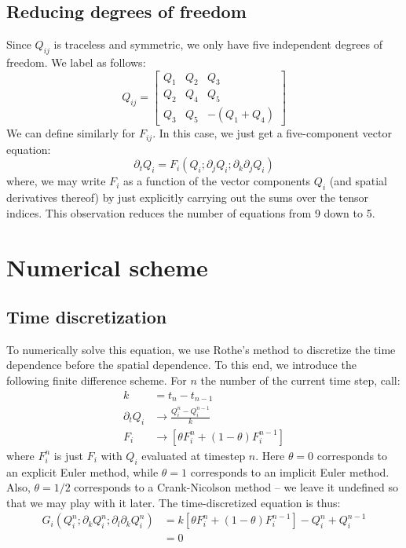 \documentclass[reqno]{article}
\begin{document}
	\subsection{Reducing degrees of freedom}
	Since $Q_{ij}$ is traceless and symmetric, we only have five independent degrees of freedom.
	We label as follows:
	\begin{equation}
	Q_{ij}
	= \begin{bmatrix}
	Q_1 & Q_2 & Q_3 \\
	Q_2 & Q_4 & Q_5 \\
	Q_3 & Q_5 & -(Q_1 + Q_4)
	\end{bmatrix}
	\end{equation}
	We can define similarly for $F_{ij}$.
	In this case, we just get a five-component vector equation:
	\begin{equation}
		\partial_t Q_i = F_i \left( Q_i ; \partial_j Q_i ; \partial_k \partial_j Q_i \right)
	\end{equation}
	where, we may write $F_i$ as a function of the vector components $Q_i$ (and spatial derivatives thereof) by just explicitly carrying out the sums over the tensor indices.
	This observation reduces the number of equations from 9 down to 5.
	
	\section{Numerical scheme}
	\subsection{Time discretization}
	To numerically solve this equation, we use Rothe's method to discretize the time dependence before the spatial dependence.
	To this end, we introduce the following finite difference scheme.
	For $n$ the number of the current time step, call:
	\begin{align}
		k &= t_n - t_{n - 1} \\
		\partial_t Q_i &\to \frac{Q^n_i - Q^{n - 1}_i}{k} \\
		F_i &\to \left[ \theta F_i^n + (1 - \theta) F_i^{n - 1} \right]
	\end{align}
	where $F^n_i$ is just $F_i$ with $Q_i$ evaluated at timestep $n$.
	Here $\theta = 0$ corresponds to an explicit Euler method, while $\theta = 1$ corresponds to an implicit Euler method.
	Also, $\theta = 1/2$ corresponds to a Crank-Nicolson method -- we leave it undefined so that we may play with it later.
	The time-discretized equation is thus:
	\begin{equation}
	\begin{split}
		G_i \left(Q^n_i ; \partial_k Q^n_i ; \partial_l \partial_k Q^n_i\right)
		&= k \left[ \theta F^n_i + (1 - \theta) F^{n - 1}_i \right]
		- Q^n_i + Q^{n - 1}_i \\
		&= 0
	\end{split}
	\end{equation}
	
\end{document}
